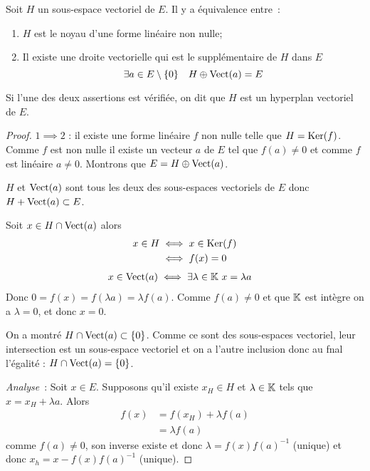 \begin{prop}
  Soit \(H\) un sous-espace vectoriel de \(E\). Il y a équivalence entre~:
  \begin{enumerate}
  \item \(H\) est le noyau d'une forme linéaire non nulle;
  \item Il existe une droite vectorielle qui est le supplémentaire de \(H\) dans \(E\)
    \begin{equation}
      \exists a \in E\setminus\{0\} \quad H \oplus \operatorname{Vect}(a) = E
    \end{equation}
  \end{enumerate}
  Si l'une des deux assertions est vérifiée, on dit que \(H\) est un hyperplan vectoriel de \(E\).
\end{prop}
\begin{proof}
  \(1 \implies 2\) : il existe une forme linéaire \(f\) non nulle telle que \(H = \operatorname{Ker}(f)\). Comme \(f\) est non nulle il existe un vecteur \(a\) de \(E\) tel que \(f(a) \neq 0\) et comme \(f\) est linéaire \(a \neq 0\). Montrons que \(E= H \oplus \operatorname{Vect}(a)\).

  \(H\) et \(\operatorname{Vect}(a)\) sont tous les deux des sous-espaces vectoriels de \(E\) donc \(H + \operatorname{Vect}(a) \subset E\).

  Soit \(x \in H \cap \operatorname{Vect}(a)\) alors
  \begin{align}
    x \in H &\iff x \in \operatorname{Ker}(f) \\
    &\iff f(x)=0
  \end{align}
  \begin{align}
    x \in \operatorname{Vect}(a) &\iff \exists \lambda \in \mathbb{K} \ x=\lambda a
  \end{align}
  Donc \(0=f(x)=f(\lambda a)=\lambda f(a)\). Comme \(f(a) \neq 0\) et que \(\mathbb{K}\) est intègre on a \(\lambda=0\), et donc \(x=0\).

  On a montré \(H \cap \operatorname{Vect}(a) \subset \{0\}\). Comme ce sont des sous-espaces vectoriel, leur intersection est un sous-espace vectoriel et on a l'autre inclusion donc au fnal l'égalité : \(H \cap \operatorname{Vect}(a) = \{0\}\).

  \emph{Analyse}~: Soit \(x \in E\). Supposons qu'il existe \(x_H \in H\) et \(\lambda \in \mathbb{K}\) tels que \(x = x_H + \lambda a\). Alors
  \begin{align}
    f(x) &= f(x_H) +\lambda f(a) \\
    &=\lambda f(a)
  \end{align}
  comme \(f(a) \neq 0\), son inverse existe et donc \(\lambda = f(x) f(a)^{-1}\) (unique) et donc \(x_h = x-f(x) f(a)^{-1}\) (unique).


\end{proof}
